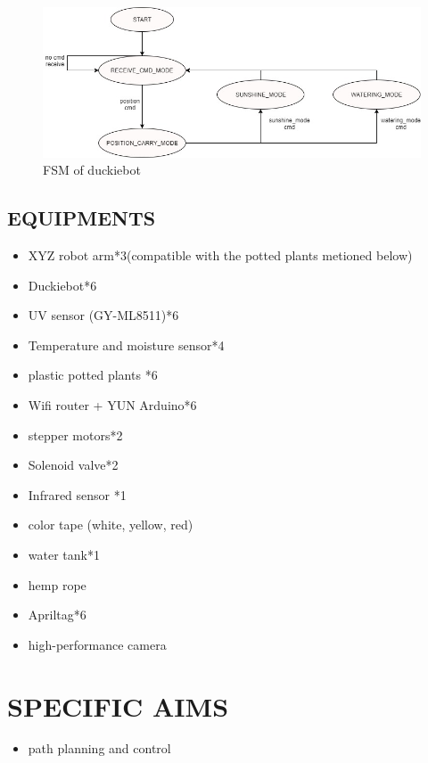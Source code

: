 \documentclass[a4paper, 10pt, conference]{ieeeconf}      %
\begin{document}
\begin{figure}[htbp] %
\includegraphics[width=0.8\columnwidth]{car_fsm.jpg}
\centering
\caption{FSM of duckiebot}
\end{figure}





\subsection{EQUIPMENTS} 

\begin{itemize}
\item XYZ robot arm*3(compatible with the potted plants metioned below)
\item Duckiebot*6
\item UV sensor (GY-ML8511)*6
\item Temperature and moisture sensor*4
\item plastic potted plants *6
\item Wifi router + YUN Arduino*6
\item stepper motors*2
\item Solenoid valve*2
\item Infrared sensor *1
\item color tape (white, yellow, red)
\item water tank*1
\item hemp rope
\item Apriltag*6
\item high-performance camera
\end{itemize}






\section{SPECIFIC AIMS}

\begin{itemize}
\item path planning and control
\end{itemize}
\end{document}
